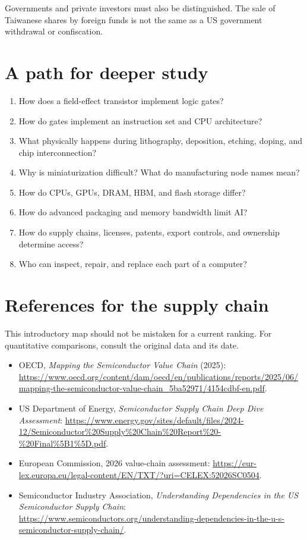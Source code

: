Governments and private investors
must also be distinguished. The
sale of Taiwanese shares by foreign
funds is not the same as a US
government withdrawal or confiscation.

\section{A path for deeper study}

\begin{enumerate}
\item How does a field-effect transistor
implement logic gates?
\item How do gates implement an
instruction set and CPU architecture?
\item What physically happens during
lithography, deposition, etching,
doping, and chip interconnection?
\item Why is miniaturization difficult?
What do manufacturing node names mean?
\item How do CPUs, GPUs, DRAM, HBM,
and flash storage differ?
\item How do advanced packaging
and memory bandwidth limit AI?
\item How do supply chains, licenses,
patents, export controls, and
ownership determine access?
\item Who can inspect, repair, and
replace each part of a computer?
\end{enumerate}

\section{References for the supply chain}

This introductory map should not
be mistaken for a current ranking.
For quantitative comparisons, consult
the original data and its date.

\begin{itemize}
\item OECD, {\it Mapping the Semiconductor
Value Chain} (2025):
\url{https://www.oecd.org/content/dam/oecd/en/publications/reports/2025/06/mapping-the-semiconductor-value-chain_5ba52971/4154cdbf-en.pdf}.
\item US Department of Energy,
{\it Semiconductor Supply Chain
Deep Dive Assessment}:
\url{https://www.energy.gov/sites/default/files/2024-12/Semiconductor%20Supply%20Chain%20Report%20-%20Final%5B1%5D.pdf}.
\item European Commission, 2026
value-chain assessment:
\url{https://eur-lex.europa.eu/legal-content/EN/TXT/?uri=CELEX:52026SC0504}.
\item Semiconductor Industry
Association, {\it Understanding
Dependencies in the US Semiconductor
Supply Chain}:
\url{https://www.semiconductors.org/understanding-dependencies-in-the-u-s-semiconductor-supply-chain/}.
\end{itemize}





